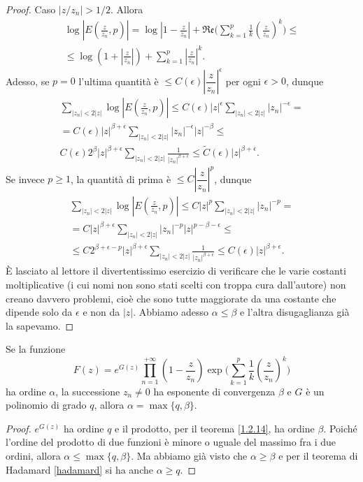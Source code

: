 \begin{proof}
  Caso $|z/z_n|>1/2$. Allora
  \begin{gather*}
    \log\left|E\left(\frac{z}{z_n},p\right)\right|=\log\left|1-\frac{z}{z_n}\right|+\mathfrak{Re}\Bigg(\sum_{k=1}^p \frac{1}{k}\left(\frac{z}{z_n}\right)^k\Bigg) \le \\
    \le \log\left(1+\left|\frac{z}{z_n}\right|\right)+\sum_{k=1}^p \left|\frac{z}{z_n}\right|^k.
  \end{gather*}
  Adesso, se $p=0$ l'ultima quantità è $\le C(\epsilon)\left|\dfrac{z}{z_n}\right|^{\epsilon}$ per ogni $\epsilon>0$, dunque
  \begin{gather*}
    \sum_{|z_n|<2|z|}\log\left|E\left(\frac{z}{z_n},p\right)\right| \le C(\epsilon)|z|^{\epsilon}\sum_{|z_n|<2|z|}|z_n|^{-\epsilon}= \\
    =C(\epsilon)|z|^{\beta+\epsilon}\sum_{|z_n|<2|z|}|z_n|^{-\epsilon}|z|^{-\beta} \le \\
    C(\epsilon)2^{\beta}|z|^{\beta+\epsilon}\sum_{|z_n|<2|z|}\frac{1}{|z_n|^{\beta+\epsilon}} \le \tilde{C}(\epsilon)|z|^{\beta+\epsilon}.
  \end{gather*}
  Se invece $p \ge 1$, la quantità di prima è $\le C\left|\dfrac{z}{z_n}\right|^p$, dunque
  \begin{gather*}
    \sum_{|z_n|<2|z|}\log\left|E\left(\frac{z}{z_n},p\right)\right| \le C|z|^p \sum_{|z_n|<2|z|}|z_n|^{-p}= \\
    =C|z|^{\beta+\epsilon}\sum_{|z_n|<2|z|}|z_n|^{-p}|z|^{p-\beta-\epsilon} \le \\
    \le C2^{\beta+\epsilon-p}|z|^{\beta+\epsilon}\sum_{|z_n|<2|z|}\frac{1}{|z_n|^{\beta+\epsilon}} \le C(\epsilon)|z|^{\beta+\epsilon}.
  \end{gather*}
  È lasciato al lettore il divertentissimo esercizio di verificare che le varie costanti moltiplicative (i cui nomi non sono stati scelti con troppa cura dall'autore) non creano davvero problemi, cioè che sono tutte maggiorate da una costante che dipende solo da $\epsilon$ e non da $|z|$. Abbiamo adesso $\alpha \le \beta$ e l'altra disugaglianza già la sapevamo.
\end{proof}

\begin{cor}
  Se la funzione
  $$F(z)=e^{G(z)}\prod_{n=1}^{+\infty}\left(1-\frac{z}{z_n}\right)\exp\Bigg(\sum_{k=1}^p\frac{1}{k}\left(\frac{z}{z_n}\right)^k\Bigg)$$
  ha ordine $\alpha$, la successione $z_n\not=0$ ha esponente di convergenza $\beta$ e $G$ è un polinomio di grado $q$, allora $\alpha=\max\{q,\beta\}$.
\end{cor}

\begin{proof}
  $e^{G(z)}$ ha ordine $q$ e il prodotto, per il teorema \ref{1.2.14}, ha ordine $\beta$. Poiché l'ordine del prodotto di due funzioni è minore o uguale del massimo fra i due ordini, allora $\alpha \le \max\{q,\beta\}$. Ma abbiamo già visto che $\alpha \ge \beta$ e per il teorema di Hadamard \ref{hadamard} si ha anche $\alpha \ge q$.
\end{proof}
